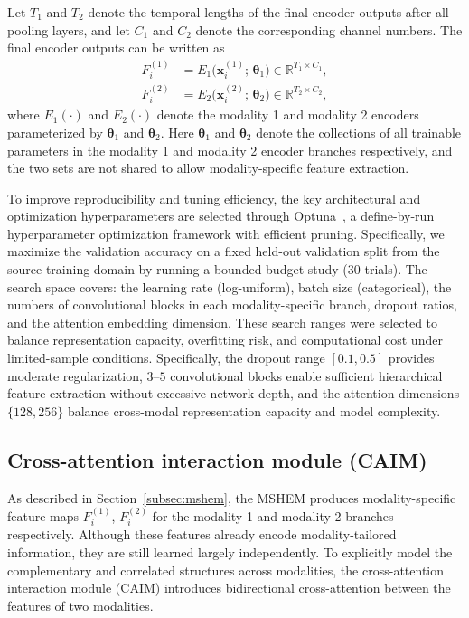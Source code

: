 \documentclass[a4paper]{cas-sc}
\begin{document}
Let $T_1$ and $T_2$ denote the temporal lengths of the final encoder outputs after all pooling layers, and let $C_1$ and $C_2$ denote the corresponding channel numbers. The final encoder outputs can be written as
\begin{equation}
\begin{aligned}
F_i^{(1)} &= E_1\big(\mathbf{x}_i^{(1)};\,\boldsymbol{\theta}_1\big) \in \mathbb{R}^{T_1 \times C_1},\\
F_i^{(2)} &= E_2\big(\mathbf{x}_i^{(2)};\,\boldsymbol{\theta}_2\big) \in \mathbb{R}^{T_2 \times C_2},
\end{aligned}
\label{eq:encoder_output}
\end{equation}
where $E_1(\cdot)$ and $E_2(\cdot)$ denote the modality 1 and modality 2 encoders parameterized by $\boldsymbol{\theta}_1$ and $\boldsymbol{\theta}_2$. Here $\boldsymbol{\theta}_1$ and $\boldsymbol{\theta}_2$ denote the collections of all trainable parameters in the modality 1 and modality 2 encoder branches respectively, and the two sets are not shared to allow modality-specific feature extraction.

To improve reproducibility and tuning efficiency, the key architectural and optimization hyperparameters are selected through Optuna~\cite{Optuna}, a define-by-run hyperparameter optimization framework with efficient pruning. Specifically, we maximize the validation accuracy on a fixed held-out validation split from the source training domain by running a bounded-budget study (30 trials). The search space covers: the learning rate (log-uniform), batch size (categorical), the numbers of convolutional blocks in each modality-specific branch, dropout ratios, and the attention embedding dimension. These search ranges were selected to balance representation
capacity, overfitting risk, and computational cost under
limited-sample conditions. Specifically, the dropout range
$[0.1,0.5]$ provides moderate regularization, $3$--$5$
convolutional blocks enable sufficient hierarchical feature
extraction without excessive network depth, and the attention
dimensions $\{128,256\}$ balance cross-modal representation
capacity and model complexity.

\subsection{Cross-attention interaction module (CAIM)}
\label{subsec:caim}

As described in Section~\ref{subsec:mshem}, the MSHEM produces modality-specific feature maps $F_i^{(1)}$, $F_i^{(2)}$ for the modality 1 and modality 2 branches respectively. Although these features already encode modality-tailored information, they are still learned largely independently. To explicitly model the complementary and correlated structures across modalities, the cross-attention interaction module (CAIM) introduces bidirectional cross-attention between the features of two modalities.
\end{document}
